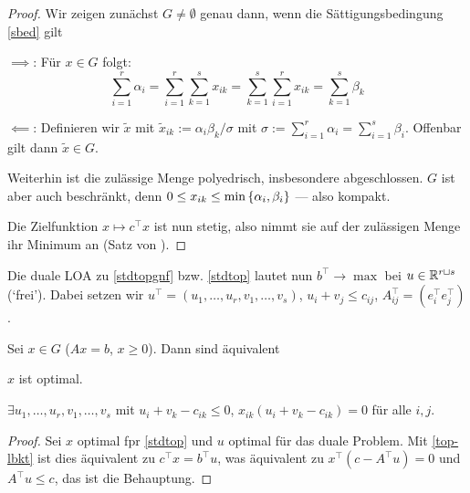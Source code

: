     \begin{proof}
        Wir zeigen zunächst $G\neq \emptyset$ genau dann, wenn die Sättigungsbedingung \autoref{sbed} gilt
        \begin{implications}
                \item[$\implies$:] Für $x\in G$ folgt:
            $$
            \sum_{i=1}^r{\alpha_i}=\sum_{i=1}^r\sum_{k=1}^s{x_{ik}}=\sum_{k=1}^s\sum_{i=1}^r{x_{ik}}=\sum_{k=1}^s\beta_k
            $$
                    \item[$\impliedby$:] Definieren wir $\tilde x$ mit $\tilde x_{ik}:=\alpha_i\beta_k/\sigma$ mit $\sigma:=\sum_{i=1}^r{\alpha_i}=\sum_{i=1}^s{\beta_i}$. Offenbar gilt dann $\tilde x\in G$.
        \end{implications}
    
        Weiterhin ist die zulässige Menge polyedrisch, insbesondere abgeschlossen. $G$ ist aber auch beschränkt, denn $0\leq x_{ik}\leq \min\set{\alpha_i,\beta_i}$ --- also kompakt.

        Die Zielfunktion $x\mapsto c^\top x$ ist nun stetig, also nimmt sie auf der zulässigen Menge ihr Minimum an (Satz von ).
    \end{proof}

    Die duale LOA zu \autoref{stdtopgnf} bzw. \autoref{stdtop} lautet nun $b^\top \to \max$ bei $u\in\mathbb{R}^{r\mathbin{\sqcup} s}$ (`frei').
    Dabei setzen wir $u^\top = (u_1,\ldots,u_r,v_1,\ldots,v_s)$, $u_i+v_j\leq c_{ij}$,
    $A^{\top}_{ij}=(e^\top_i e^\top_j)$.

    \begin{theorem}[Optimalitätskriterium]
        Sei $x\in G$ ($Ax=b$, $x\geq 0$). Dann sind äquivalent
        \begin{statements}
                \item $x$ ist optimal.
            \item $\exists u_1,\ldots,u_r,v_1,\ldots,v_s$ mit $u_i+v_k-c_{ik}\leq 0$, $x_{ik}(u_i+v_k-c_{ik})=0$ für alle $i,j$.
        \end{statements}
    \end{theorem}

    \begin{proof}
        Sei $x$ optimal fpr \autoref{stdtop} und $u$ optimal für das duale Problem. Mit \autoref{top-lbkt} ist dies äquivalent zu $c^\top x=b^\top u$, was äquivalent zu $x^\top(c-A^\top u)=0$ und $A^\top u\leq c$, das ist die Behauptung.
    \end{proof}

